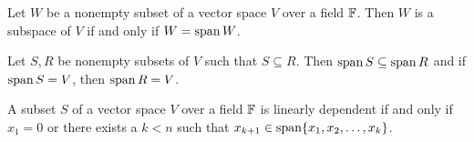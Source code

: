 \begin{proposition}
	Let $W$ be a nonempty subset of a vector space $V$ over a field $\mathbb{F}$.
	Then $W$ is a subspace of $V$ if and only if $W=\operatorname{span} W$.
\end{proposition}

\begin{proposition}
	Let $S,R$ be nonempty subsets of $V$ such that $S\subseteq R$.
	Then $\operatorname{span} S\subseteq \operatorname{span} R$ and if $\operatorname{span} S=V$, then $\operatorname{span} R=V$.
\end{proposition}

\begin{thm}
	A subset $S$ of a vector space $V$ over a field $\mathbb{F}$ is linearly dependent if and only if $x_1=0$ or there exists a $k<n$ such that $x_{k+1}\in\operatorname{span} \lbrace x_1,x_2,\ldots,x_k \rbrace$.
\end{thm}
